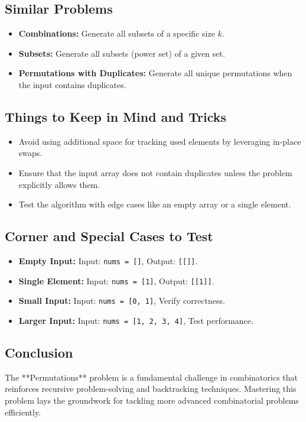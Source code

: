 \subsection*{Similar Problems}
\begin{itemize}
    \item \textbf{Combinations:} Generate all subsets of a specific size \(k\).
    \item \textbf{Subsets:} Generate all subsets (power set) of a given set.
    \item \textbf{Permutations with Duplicates:} Generate all unique permutations when the input contains duplicates.
\end{itemize}

\subsection*{Things to Keep in Mind and Tricks}
\begin{itemize}
    \item Avoid using additional space for tracking used elements by leveraging in-place swaps.
    \item Ensure that the input array does not contain duplicates unless the problem explicitly allows them.
    \item Test the algorithm with edge cases like an empty array or a single element.
\end{itemize}

\subsection*{Corner and Special Cases to Test}
\begin{itemize}
    \item \textbf{Empty Input:} Input: \texttt{nums = []}, Output: \texttt{[[]]}.
    \item \textbf{Single Element:} Input: \texttt{nums = [1]}, Output: \texttt{[[1]]}.
    \item \textbf{Small Input:} Input: \texttt{nums = [0, 1]}, Verify correctness.
    \item \textbf{Larger Input:} Input: \texttt{nums = [1, 2, 3, 4]}, Test performance.
\end{itemize}

\subsection*{Conclusion}
The **Permutations** problem is a fundamental challenge in combinatorics that reinforces recursive problem-solving and backtracking techniques. Mastering this problem lays the groundwork for tackling more advanced combinatorial problems efficiently.